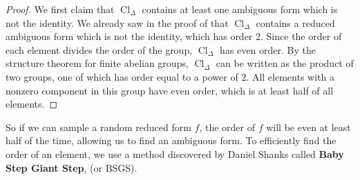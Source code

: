 \documentclass[honours,12pt]{unswthesis}
\DeclareMathOperator{\Cl}{Cl}
\numberwithin{equation}{section}
\begin{document}
\begin{proof}
    We first claim that $\Cl_\Delta$ contains at least one ambiguous form which is not the identity.
    We already saw in the proof of  that $\Cl_\Delta$ contains a reduced ambiguous form which is not the identity, which has order 2.
    Since the order of each element divides the order of the group, $\Cl_\Delta$ has even order.
    By the structure theorem for finite abelian groups, $\Cl_\Delta$ can be written as the product of two groups, one of which has order equal to a power of 2.
    All elements with a nonzero component in this group have even order, which is at least half of all elements.
\end{proof}

So if we can sample a random reduced form $f$, the order of $f$ will be even at least half of the time, allowing us to find an ambiguous form.
To efficiently find the order of an element, we use a method discovered by Daniel Shanks called \textbf{Baby Step Giant Step}, (or BSGS).
\end{document}
